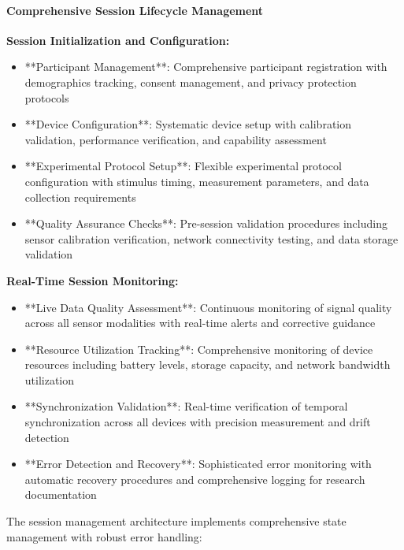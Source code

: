 \documentclass[11pt,a4paper]{report}
\begin{document}
\paragraph{Comprehensive Session Lifecycle Management}

\textbf{Session Initialization and Configuration:}

\begin{itemize}
\item **Participant Management**: Comprehensive participant registration with demographics tracking, consent management, and
  privacy protection protocols
\item **Device Configuration**: Systematic device setup with calibration validation, performance verification, and
  capability assessment
\item **Experimental Protocol Setup**: Flexible experimental protocol configuration with stimulus timing, measurement
  parameters, and data collection requirements
\item **Quality Assurance Checks**: Pre-session validation procedures including sensor calibration verification, network
  connectivity testing, and data storage validation

\end{itemize}
\textbf{Real-Time Session Monitoring:}

\begin{itemize}
\item **Live Data Quality Assessment**: Continuous monitoring of signal quality across all sensor modalities with real-time
  alerts and corrective guidance
\item **Resource Utilization Tracking**: Comprehensive monitoring of device resources including battery levels, storage
  capacity, and network bandwidth utilization
\item **Synchronization Validation**: Real-time verification of temporal synchronization across all devices with precision
  measurement and drift detection
\item **Error Detection and Recovery**: Sophisticated error monitoring with automatic recovery procedures and comprehensive
  logging for research documentation

\end{itemize}
The session management architecture implements comprehensive state management with robust error handling:
\end{document}
